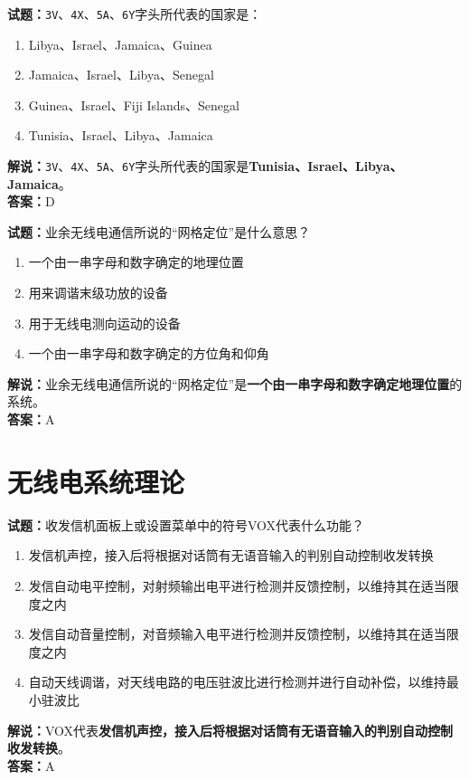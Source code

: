 \documentclass{ctexbook}
\begin{document}
\bigskip


\noindent\textbf{试题：}\texttt{3V}、\texttt{4X}、\texttt{5A}、\texttt{6Y}字头所代表的国家是：
\begin{enumerate}[leftmargin=3em]
	\item Libya、Israel、Jamaica、Guinea
	\item Jamaica、Israel、Libya、Senegal
	\item Guinea、Israel、Fiji Islands、Senegal
	\item Tunisia、Israel、Libya、Jamaica %
\end{enumerate}
\noindent\textbf{解说：}\texttt{3V}、\texttt{4X}、\texttt{5A}、\texttt{6Y}字头所代表的国家是\textbf{Tunisia、Israel、Libya、Jamaica}。\\\noindent\textbf{答案：}D

\bigskip


\noindent\textbf{试题：}业余无线电通信所说的“网格定位”是什么意思？
\begin{enumerate}[leftmargin=3em]
	\item 一个由一串字母和数字确定的地理位置 %
	\item 用来调谐末级功放的设备
	\item 用于无线电测向运动的设备
	\item 一个由一串字母和数字确定的方位角和仰角
\end{enumerate}
\noindent\textbf{解说：}业余无线电通信所说的“网格定位”是\textbf{一个由一串字母和数字确定地理位置}的系统。\\\noindent\textbf{答案：}A






















\chapter{无线电系统理论}

\newpage


\noindent\textbf{试题：}收发信机面板上或设置菜单中的符号VOX代表什么功能？
\begin{enumerate}[leftmargin=3em]
\item 发信机声控，接入后将根据对话筒有无语音输入的判别自动控制收发转换
\item 发信自动电平控制，对射频输出电平进行检测并反馈控制，以维持其在适当限度之内
\item 发信自动音量控制，对音频输入电平进行检测并反馈控制，以维持其在适当限度之内
\item 自动天线调谐，对天线电路的电压驻波比进行检测并进行自动补偿，以维持最小驻波比
\end{enumerate}
\noindent\textbf{解说：}VOX代表\textbf{发信机声控，接入后将根据对话筒有无语音输入的判别自动控制收发转换}。\\\noindent\textbf{答案：}A
\end{document}
